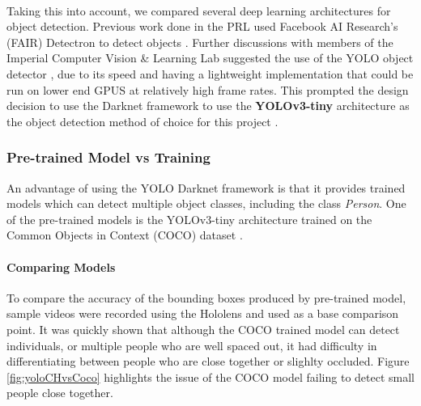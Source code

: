 \paragraph{} Taking this into account, we compared several deep learning architectures for object detection. Previous work done in the PRL used Facebook AI Research's (FAIR) Detectron to detect objects \cite{Chacon-Quesada, Detectron2018, Rena}. Further discussions with members of the Imperial Computer Vision \& Learning Lab suggested the use of the YOLO object detector \cite{Redmon}, due to its speed and having a lightweight implementation that could be run on lower end GPUS at relatively high frame rates. This prompted the design decision to use the Darknet framework to use the \textbf{YOLOv3-tiny} architecture as the object detection method of choice for this project \cite{Redmon2018}.

\subsubsection{Pre-trained Model vs Training}
An advantage of using the YOLO Darknet framework is that it provides trained models which can detect multiple object classes, including the class \textit{Person}. One of the pre-trained models is the YOLOv3-tiny architecture trained on the Common Objects in Context (COCO) dataset \cite{Lin}.

\paragraph{Comparing Models} To compare the accuracy of the bounding boxes produced by pre-trained model, sample videos were recorded using the Hololens and used as a base comparison point. It was quickly shown that although the COCO trained model can detect individuals, or multiple people who are well spaced out, it had difficulty in differentiating between people who are close together or slighlty occluded. Figure \ref{fig:yoloCHvsCoco} highlights the issue of the COCO model failing to detect small people close together.

